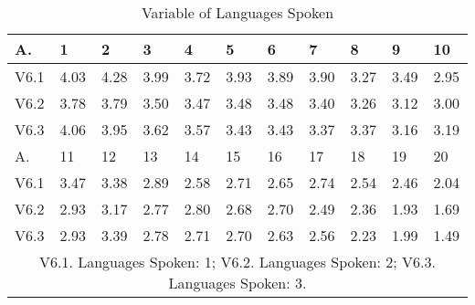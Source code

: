 \documentclass[english]{textolivre}
\begin{document}
\begin{table}[htpb]
\caption{Variable of Languages Spoken}
\label{figure8}
\centering
\begin{tabular}{lllllllllll}
\toprule
A. & 1 & 2 & 3 & 4 & 5 & 6 & 7 & 8 & 9 & 10
\\ 
\midrule
V6.1 & 4.03 & 4.28 & 3.99 & 3.72 & 3.93 & 3.89 & 3.90 & 3.27 & 3.49 & 2.95
\\
V6.2 & 3.78 & 3.79 & 3.50 & 3.47 & 3.48 & 3.48 & 3.40 & 3.26 & 3.12 & 3.00
\\
V6.3 & 4.06 & 3.95 & 3.62 & 3.57 & 3.43 & 3.43 & 3.37 & 3.37 & 3.16 & 3.19
\\
\midrule
A. & 11 & 12 & 13 & 14 & 15 & 16 & 17 & 18 & 19 & 20
\\
\midrule
V6.1 & 3.47 & 3.38 & 2.89 & 2.58 & 2.71 & 2.65 & 2.74 & 2.54 & 2.46 & 2.04
\\
V6.2 & 2.93 & 3.17 & 2.77 & 2.80 & 2.68 & 2.70 & 2.49 & 2.36 & 1.93 & 1.69
\\
V6.3 & 2.93 & 3.39 & 2.78 & 2.71 & 2.70 & 2.63 & 2.56 & 2.23 & 1.99 & 1.49
\\ 
\midrule
\multicolumn{11}{c}{V6.1. Languages Spoken: 1; V6.2. Languages Spoken: 2; V6.3. Languages Spoken: 3.}
\\
\bottomrule
\end{tabular}
\\
\centering
\end{table}
\end{document}
